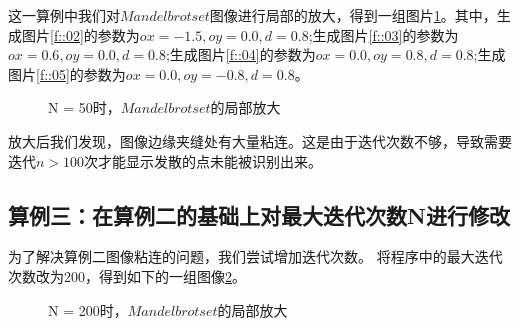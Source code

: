 \documentclass{ctexart}
\begin{document}
这一算例中我们对$Mandelbrot set$图像进行局部的放大，得到一组图片\ref{g::02}。其中，生成图片\ref{f::02}的参数为$ox=-1.5,oy=0.0,d=0.8$;生成图片\ref{f::03}的参数为$ox=0.6,oy=0.0,d=0.8$;生成图片\ref{f::04}的参数为$ox=0.0,oy=0.8,d=0.8$;生成图片\ref{f::05}的参数为$ox=0.0,oy=-0.8,d=0.8$。

\begin{figure}[ht]
  \hspace{0.5in}
  \hspace{0in}
  \hspace{0.5in}
  \label{g::02}
  \caption{N = 50时，$Mandelbrot set$的局部放大}
\end{figure}

放大后我们发现，图像边缘夹缝处有大量粘连。这是由于迭代次数不够，导致需要迭代$n>100$次才能显示发散的点未能被识别出来。

\subsection{算例三：在算例二的基础上对最大迭代次数N进行修改}

为了解决算例二图像粘连的问题，我们尝试增加迭代次数。
将程序中的最大迭代次数改为200，得到如下的一组图像\ref{g::03}。

\begin{figure}[ht]
  \hspace{0.5in}
  \hspace{0in}
  \hspace{0.5in}
  \label{g::03}
  \caption{N = 200时，$Mandelbrot set$的局部放大}
\end{figure}
\end{document}
